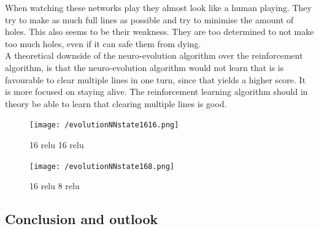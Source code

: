 \documentclass{report}
\begin{document}
When watching these networks play they almost look like a human playing. They try to make as much full lines as possible and try to minimise the amount of holes. This also seems to be their weakness. They are too determined to not make too much holes, even if it can safe them from dying.\\
A theoretical downside of the neuro-evolution algorithm over the reinforcement algorithm, is that the neuro-evolution algorithm would not learn that is is favourable to clear multiple lines in one turn, since that yields a higher score. It is more focused on staying alive. The reinforcement learning algorithm should in theory be able to learn that clearing multiple lines is good. 
\begin{figure}[h]
	\centering
	\begin{minipage}[b]{0.45\textwidth}
   		\texttt{[image: /evolutionNNstate1616.png]}
    	\caption{16 relu 16 relu}
    	\label{fig:evo1}
 	\end{minipage}
  	\begin{minipage}[b]{0.45\textwidth}
    	\texttt{[image: /evolutionNNstate168.png]}
    	\caption{16 relu 8 relu}
    	\label{fig:evo2}
 	\end{minipage}
\end{figure}

\subsection{Conclusion and outlook}
\end{document}
